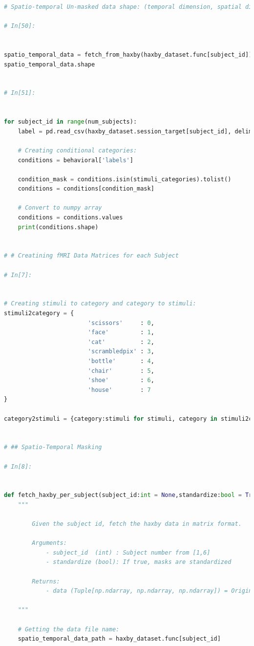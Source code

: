 \documentclass[10pt, twocolumn, letterpaper]{article}
\begin{document}
\begin{lstlisting}[language=Python]
# Spatio-temporal Un-masked data shape: (temporal dimension, spatial dimension 1, spatial dimension 2, # of experiments)

# In[50]:


spatio_temporal_data = fetch_from_haxby(haxby_dataset.func[subject_id])
spatio_temporal_data.shape


# In[51]:


for subject_id in range(num_subjects):
    label = pd.read_csv(haxby_dataset.session_target[subject_id], delimiter=' ')
    
    # Creating conditional categories:
    conditions = behavioral['labels']

    condition_mask = conditions.isin(stimuli_categories).tolist()
    conditions = conditions[condition_mask]
    
    # Convert to numpy array
    conditions = conditions.values
    print(conditions.shape)   


# # Creatining fMRI Data Matrices for each Subject

# In[7]:


# Creating stimuli to category and category to stimuli:
stimuli2category = {
                        'scissors'     : 0,
                        'face'         : 1, 
                        'cat'          : 2,
                        'scrambledpix' : 3,
                        'bottle'       : 4,
                        'chair'        : 5,
                        'shoe'         : 6,
                        'house'        : 7
}

category2stimuli = {category:stimuli for stimuli, category in stimuli2category.items()}


# ## Spatio-Temporal Masking

# In[8]:


def fetch_haxby_per_subject(subject_id:int = None,standardize:bool = True) -> Tuple[np.ndarray, np.ndarray, np.ndarray]:
    """
    
        Given the subject id, fetch the haxby data in matrix format.
        
        Arguments:
            - subject_id  (int) : Subject number from [1,6]
            - standardize (bool): If true, masks are standardized
            
        Returns:
            - data (Tuple[np.ndarray, np.ndarray, np.ndarray]) = Original 4-D data, Flattened + Masked Data, Label  
    
    """
        
    # Getting the data file name:
    spatio_temporal_data_path = haxby_dataset.func[subject_id]  
   

\end{lstlisting}
\end{document}

